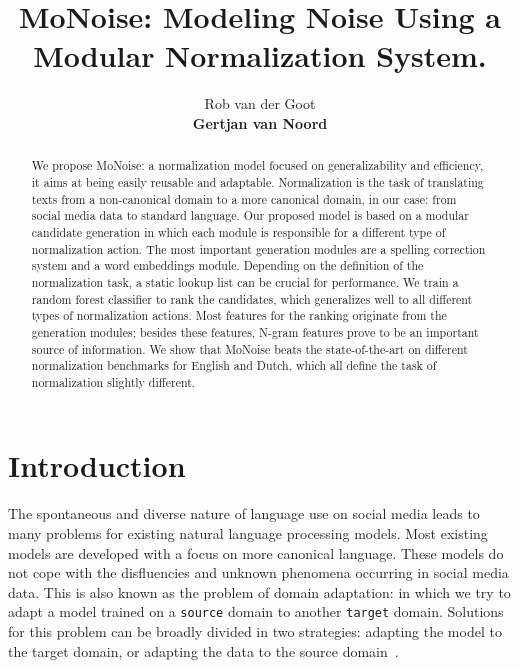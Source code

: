 \documentclass[a4paper,10pt,twoside]{article}
\begin{document}
\title{MoNoise: Modeling Noise Using a Modular Normalization System.}

\author{Rob van der Goot \\
{\normalsize \bf Gertjan van Noord} 
\AND {}}


\maketitle\thispagestyle{empty} 


\begin{abstract}
We propose MoNoise: a normalization model focused on generalizability and
efficiency, it aims at being easily reusable and adaptable. Normalization is
the task of translating texts from a non-canonical domain to a more canonical
domain, in our case: from social media data to standard language. Our proposed
model is based on a modular candidate generation in which each module is
responsible for a different type of normalization action. The most important
generation modules are a spelling correction system and a word embeddings
module. Depending on the definition of the normalization task, a static lookup
list can be crucial for performance. We train a random forest classifier to
rank the candidates, which generalizes well to all different types of
normalization actions. Most features for the ranking originate from the
generation modules; besides these features, N-gram features prove to be an
important source of information. We show that MoNoise beats the
state-of-the-art on different normalization benchmarks for English and Dutch,
which all define the task of normalization slightly different. 

 \end{abstract}

\section{Introduction}
\label{sec:introduction}
The spontaneous and diverse nature of language use on social media leads to
many problems for existing natural language processing models. Most
existing models are developed with a focus on more canonical language. These
models do not cope with the disfluencies and unknown phenomena occurring in
social media data. This is also known as the problem of domain adaptation: in
which we try to adapt a model trained on a \texttt{source} domain to another
\texttt{target} domain.  Solutions for this problem can be broadly divided in
two strategies: adapting the model to the target domain, or adapting the data
to the source domain~\cite{eisenstein:2013:NAACL-HLT}.
\end{document}
